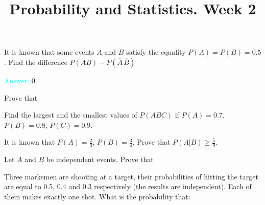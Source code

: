 \documentclass[14pt]{exam}
\title{Probability and Statistics. Week 2}
\date{}
\begin{document}
	\maketitle
	
	
	\begin{questions}
		\question
		It is known that some events $A$ and $B$ satisfy the equality $P(A) = P(B) = 0.5$. Find the difference $P(AB) - P(\overline{A}\, \overline{B})$
		
		\textcolor{cyan}{Answer:} $0$.
		
		\question
		Prove that
		
		\question
		Find the largest and the smallest values of $P(ABC)$ if $P(A) = 0.7$, $P(B) = 0.8$, $P(C) = 0.9$.
		
		\question
		It is known that $P(A) = \frac{2}{3}$, $P(B) = \frac{3}{4}$. Prove that $P(A | B) \geq \frac{5}{9}$.
		
		\question
		Let $A$ and $B$ be independent events. Prove that
		
		
		
		\question
		Three marksmen are shooting at a target, their probabilities of hitting the target are equal to 0.5, 0.4 and 0.3 respectively (the results are independent). Each of them makes exactly one shot. What is the probability that:
		\begin{parts}

\end{parts}
\end{questions}
\end{document}
